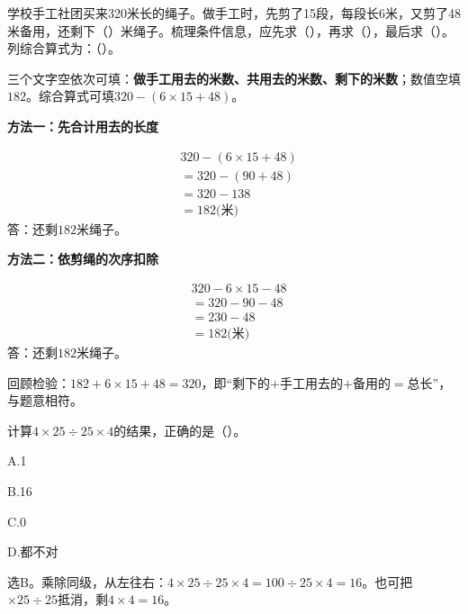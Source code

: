 学校手工社团买来320米长的绳子。做手工时，先剪了15段，每段长6米，又剪了48米备用，还剩下（\hspace{1.8em}）米绳子。梳理条件信息，应先求（\hspace{1.8em}），再求（\hspace{1.8em}），最后求（\hspace{1.8em}）。列综合算式为：（\hspace{1.8em}）。\par
\begin{BookAnswer}
三个文字空依次可填：\textbf{做手工用去的米数、共用去的米数、剩下的米数}；数值空填\(182\)。综合算式可填\(320-(6\times15+48)\)。\par \par\noindent\begin{minipage}{\linewidth}\textbf{方法一：先合计用去的长度}\par \[\begin{aligned}&320-(6\times15+48)\\&=320-(90+48)\\&=320-138\\&=182\text{(米)}\end{aligned}\]答：还剩\(182\)米绳子。\end{minipage}\par \par \par\noindent\begin{minipage}{\linewidth}\textbf{方法二：依剪绳的次序扣除}\par \[\begin{aligned}&320-6\times15-48\\&=320-90-48\\&=230-48\\&=182\text{(米)}\end{aligned}\]答：还剩\(182\)米绳子。\end{minipage}\par \par 回顾检验：\(182+6\times15+48=320\)，即“剩下的\(+\)手工用去的\(+\)备用的\(=\)总长”，与题意相符。
\end{BookAnswer}

计算\(4\times25\div25\times4\)的结果，正确的是（\hspace{1.8em}）。\par
\noindent A.1\par
\noindent B.16\par
\noindent C.0\par
\noindent D.都不对\par
\begin{BookAnswer}
选\(\mathrm B\)。乘除同级，从左往右：\(4\times25\div25\times4=100\div25\times4=16\)。也可把\(\times25\div25\)抵消，剩\(4\times4=16\)。
\end{BookAnswer}

